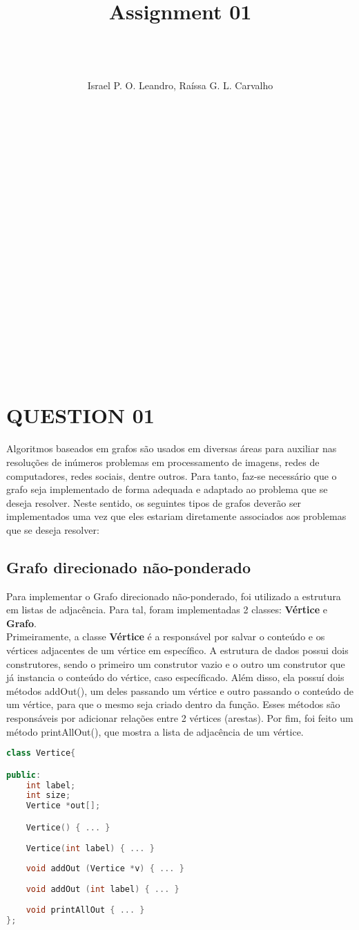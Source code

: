 \documentclass[12pt]{article}
\title{
  Assignment 01
 }
\author{
 \\ \\ \\Israel P. O. Leandro, Raíssa G. L. Carvalho
 \\ \\ \\ \\ \\ \\ \\ \\ \\ \\ \\ \\ \\ \\ \\ \\ \\ \\ \\ \\ \\ 
 }
\begin{document}
 
\maketitle
\pagebreak

\tableofcontents

\clearpage
\pagebreak

\section{QUESTION 01}

Algoritmos baseados em grafos são usados em diversas áreas para auxiliar nas resoluções de inúmeros problemas em
processamento de imagens, redes de computadores, redes sociais, dentre outros. Para tanto, faz-se necessário que o grafo
seja implementado de forma adequada e adaptado ao problema que se deseja resolver. Neste sentido, os seguintes tipos de
grafos deverão ser implementados uma vez que eles estariam diretamente associados aos problemas que se deseja resolver:

\subsection{Grafo direcionado não-ponderado}
Para implementar o Grafo direcionado não-ponderado, foi utilizado a estrutura em listas de adjacência. Para tal, foram implementadas 2 classes: \textbf{Vértice} e \textbf{Grafo}. \\
Primeiramente, a classe \textbf{Vértice} é a responsável por salvar o conteúdo e os vértices adjacentes de um vértice em específico. A estrutura de dados possui dois construtores, sendo o primeiro um construtor vazio e o outro um construtor que já instancia o conteúdo do vértice, caso específicado. Além disso, ela possuí dois métodos addOut(), um deles passando um vértice e outro passando o conteúdo de um vértice, para que o mesmo seja criado dentro da função. Esses métodos são responsáveis por adicionar relações entre 2 vértices (arestas). Por fim, foi feito um método printAllOut(), que mostra a lista de adjacência de um vértice.

\begin{lstlisting}[language = C++]
class Vertice{

public:
    int label;
    int size;
    Vertice *out[];

    Vertice() { ... }
    
    Vertice(int label) { ... }
    
    void addOut (Vertice *v) { ... }
    
    void addOut (int label) { ... }
    
    void printAllOut { ... }
};
\end{lstlisting}
\end{document}
